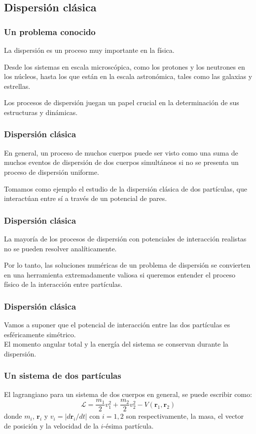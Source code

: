 \subsection{Dispersión clásica}
\begin{frame}
\frametitle{Un problema conocido}
La dispersión es un proceso muy importante en la física.
\par
Desde los sistemas en escala microscópica, como los protones y los neutrones en los núcleos, hasta los que están en la escala astronómica, tales como las galaxias y estrellas.
\par
Los procesos de dispersión juegan un papel crucial en la determinación de sus estructuras y dinámicas.
\end{frame}
\begin{frame}
\frametitle{Dispersión clásica}
En general, un proceso de muchos cuerpos puede ser visto como una suma de muchos eventos de dispersión de dos cuerpos simultáneos si no se presenta un proceso de dispersión uniforme.
\end{frame}
\begin{frame}
Tomamos como ejemplo el estudio de la dispersión clásica de dos partículas, que interactúan entre sí a través de un potencial de pares. 
\end{frame}
\begin{frame}
\frametitle{Dispersión clásica}
La mayoría de los procesos de dispersión con potenciales de interacción realistas no se pueden resolver analíticamente. 
\par
Por lo tanto, las soluciones numéricas de un problema de dispersión se convierten en una herramienta extremadamente valiosa si queremos entender el proceso físico de la interacción entre partículas.
\end{frame}
\begin{frame}
\frametitle{Dispersión clásica}
Vamos a suponer que el potencial de interacción entre las dos partículas es esféricamente
simétrico.
\\
\bigskip
El momento angular total y la energía del sistema se conservan durante la dispersión.
\end{frame}
\begin{frame}
\frametitle{Un sistema de dos partículas}
El lagrangiano para un sistema de dos cuerpos en general, se puede escribir como:
\[ \mathcal{L} = \dfrac{m_{1}}{2} v_{1}^{2} + \dfrac{m_{2}}{2} v_{2}^{2} - V(\mathbf{r}_{1},\mathbf{r}_2)\]
donde $m_{i}$, $\mathbf{r}_{i}$ y $v_{i} = \vert d \mathbf{r}_{i}/dt  \vert$ con $i = 1,2$ son respectivamente, la masa, el vector de posición y la velocidad de la $i$-ésima partícula.
\end{frame}
